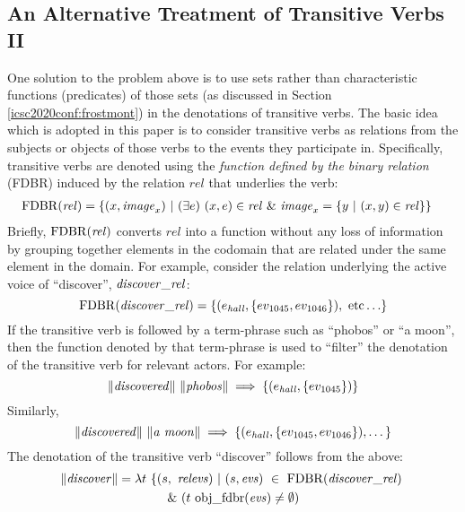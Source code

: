 \documentclass[../main.tex]{subfiles}
\begin{document}
\begin{refsection}
\subsection{An Alternative Treatment of Transitive Verbs II}
\label{icsc2020conf:altvbii}


One solution to the problem above is to use sets rather than characteristic functions (predicates) of those sets (as discussed in Section \ref{icsc2020conf:frostmont}) in the denotations of transitive verbs. The basic idea \cite{frost1989constructing} which is adopted in this paper is to consider transitive verbs as relations from the subjects or objects of those verbs to the events they participate in. 
Specifically, transitive verbs are denoted using the {\em function defined by the binary relation} (FDBR) \cite{peelar2016accommodating} induced by the relation $\mathit{rel}$ that underlies the verb:
\begin{equation*}
	\begin{split}
		&\mathrm{FDBR}({\mathit{rel}}) = \{(x, \mathit{image}_x)\ | \ (\exists e)\ (x, e) \in \mathit{rel}\ \& \ \mathit{image}_x = \{ y\ |\ (x, y) \in \mathit{rel} \}  \}
	\end{split}
\end{equation*}
Briefly, $\mathrm{FDBR}({\mathit{rel}})$ converts $\mathit{rel}$ into a function without any loss of information by grouping together elements in the codomain that are related under the same element in the domain. For example, consider the relation underlying the active voice of ``discover'', $\mathit{discover\_rel}$:
\[ \FDBR{\relation{discover}} = \{(\entityassoc{\hall}, \{ \eventassoc{1045}, \eventassoc{1046} \} ),\ \mathrm{etc} \ldots \} \]
If the transitive verb is followed by a term-phrase such as ``phobos'' or ``a moon'', then
the function denoted by that term-phrase is used to ``filter'' the denotation of the transitive verb for relevant actors. For example:
\[ \lVert \mathit{discovered} \rVert \ \lVert \mathit{phobos} \rVert \implies \{ (e_{\mathit{hall}}, \{ ev_{\mathrm{1045}} \} ) \} \]
Similarly,
\[\meaningof{discovered} \ \meaningof{a\ moon} \implies \{ (\entityassoc{\hall}, \{ \eventassoc{1045}, \eventassoc{1046} \} ), \dots \} \]
\noindent The denotation of the transitive verb ``discover'' follows from the above:
\begin{multline*}
	\meaningof{discover} =
	\lambda t\ \{ (s,\ \mathit{relevs})\ |\ (s, \mathit{evs})\ \in\ \FDBR{\relation{discover}}\  \\
	\&\ (t\ \objfdbr{evs} \neq \emptyset)

\end{multline*}
\end{refsection}
\end{document}
